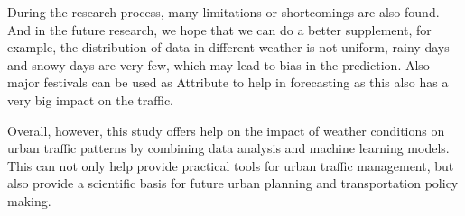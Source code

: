 \documentclass[11pt]{article}
\begin{document}
During the research process, many limitations or shortcomings are also found. And in the future research, we hope that we can do a better supplement, for example, the distribution of data in different weather is not uniform, rainy days and snowy days are very few, which may lead to bias in the prediction. Also major festivals can be used as Attribute to help in forecasting as this also has a very big impact on the traffic. 

Overall, however, this study offers help on the impact of weather conditions on urban traffic patterns by combining data analysis and machine learning models. This can not only help provide practical tools for urban traffic management, but also provide a scientific basis for future urban planning and transportation policy making.


\clearpage

\printbibliography
\end{document}

